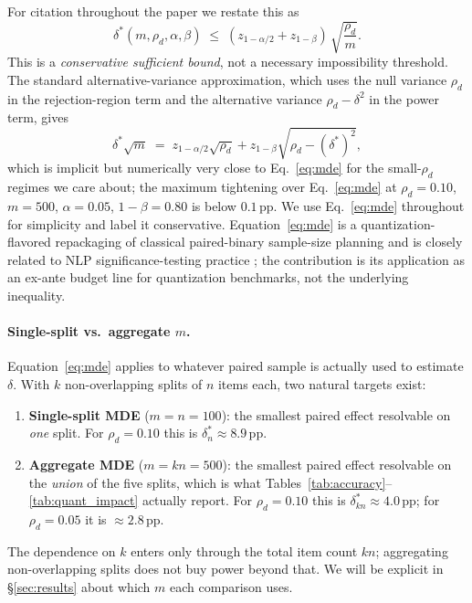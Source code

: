 \documentclass{article}
\begin{document}
For citation throughout the paper we restate this as
\begin{equation}
\label{eq:mde}
    \delta^*(m, \rho_d, \alpha, \beta) \;\le\; (z_{1-\alpha/2} + z_{1-\beta})\,\sqrt{\frac{\rho_d}{m}}.
\end{equation}
This is a \emph{conservative sufficient bound}, not a necessary impossibility threshold. The standard alternative-variance approximation, which uses the null variance $\rho_d$ in the rejection-region term and the alternative variance $\rho_d - \delta^2$ in the power term, gives
\begin{equation*}
\delta^*\sqrt{m} \;=\; z_{1-\alpha/2}\sqrt{\rho_d} + z_{1-\beta}\sqrt{\rho_d - (\delta^*)^2},
\end{equation*}
which is implicit but numerically very close to Eq.~\ref{eq:mde} for the small-$\rho_d$ regimes we care about; the maximum tightening over Eq.~\ref{eq:mde} at $\rho_d{=}0.10$, $m{=}500$, $\alpha{=}0.05$, $1-\beta{=}0.80$ is below $0.1$\,pp. We use Eq.~\ref{eq:mde} throughout for simplicity and label it conservative. Equation~\ref{eq:mde} is a quantization-flavored repackaging of classical paired-binary sample-size planning \citep{miettinen1968matched, connor1987sample, lachin1992sample} and is closely related to NLP significance-testing practice \citep{yeh2000more, dror2018hitchhiker}; the contribution is its application as an ex-ante budget line for quantization benchmarks, not the underlying inequality.

\paragraph{Single-split vs.\ aggregate $m$.}
Equation~\ref{eq:mde} applies to whatever paired sample is actually used to estimate $\delta$. With $k$ non-overlapping splits of $n$ items each, two natural targets exist:
\begin{enumerate}
\item \textbf{Single-split MDE} ($m{=}n{=}100$): the smallest paired effect resolvable on \emph{one} split. For $\rho_d{=}0.10$ this is $\delta^*_{n} \approx 8.9$\,pp.
\item \textbf{Aggregate MDE} ($m{=}kn{=}500$): the smallest paired effect resolvable on the \emph{union} of the five splits, which is what Tables~\ref{tab:accuracy}--\ref{tab:quant_impact} actually report. For $\rho_d{=}0.10$ this is $\delta^*_{kn} \approx 4.0$\,pp; for $\rho_d{=}0.05$ it is $\approx 2.8$\,pp.
\end{enumerate}
The dependence on $k$ enters only through the total item count $kn$; aggregating non-overlapping splits does not buy power beyond that. We will be explicit in §\ref{sec:results} about which $m$ each comparison uses.
\end{document}
